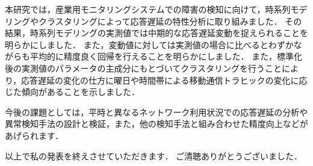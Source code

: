 \documentclass[a4j]{jarticle}
\begin{document}
本研究では，産業用モニタリングシステムでの障害の検知に向けて，時系列モデリングやクラスタリングによって応答遅延の特性分析に取り組みました．
その結果，時系列モデリングの実測値では中期的な応答遅延変動を捉えられることを明らかにしました．
また，変動値に対しては実測値の場合に比べるとわずかながらも平均的に精度良く回帰を行えることを明らかにしました．
また，標準化後の実測値のパラメータの主成分にもとづいてクラスタリングを行うことにより，応答遅延の変化の仕方に曜日や時間帯による移動通信トラヒックの変化に応じた傾向があることを示しました．

今後の課題としては，平時と異なるネットワーク利用状況での応答遅延の分析や異常検知手法の設計と検証，また，他の検知手法と組み合わせた精度向上などがあげられます．

以上で私の発表を終えさせていただきます．
ご清聴ありがとうございました．
\end{document}
